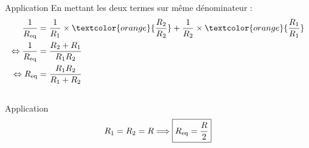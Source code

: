 \documentclass[../main/main.tex]{subfiles}
\begin{document}
\begin{tcbraster}[raster columns=2, raster equal height=rows]
    \begin{NCexem}{Application}
        En mettant les deux termes sur même dénominateur :
        \begin{align*}
            \frac{1}{ R_{\rm eq}} & = \frac{1}{R_1}\times \textcolor{orange}{
            \frac{R_2}{R_2}} + \frac{1}{R_2}\times \textcolor{orange}{
        \frac{R_1}{R_1}} \\
         \Leftrightarrow \frac{1}{ R_{\rm eq}} & = \frac{R_2 + R_1}{R_1R_2}\\
         \Leftrightarrow R_{\rm eq}            & = \frac{R_1R_2}{R_1+R_2}
        \end{align*}
    \end{NCexem}
\end{tcbraster}

\subsection{}
\begin{center}
    \begin{NCexem}[width=.5\linewidth]{Application}
        \[R_1 = R_2 = R \Longrightarrow \boxed{ R_{\rm eq} = \frac{R}{2}}\]
    \end{NCexem}
\end{center}
\end{document}
